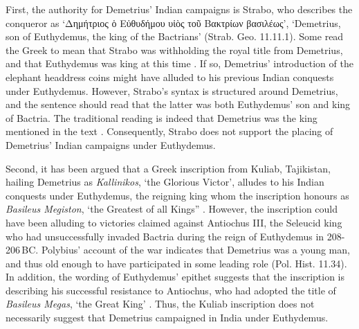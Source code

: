 \documentclass{ijsra}
\renewcommand\BC{{\,BC\xspace}}
\begin{document}
First, the authority for Demetrius’ Indian campaigns is Strabo, who describes the conqueror as \enquote*{Δημήτριος ὁ Εὐθυδήμου υἱὸς τοῦ Βακτρίων βασιλέως},
‘Demetrius, son of Euthydemus, the king of the Bactrians’ (Strab. Geo. 11.11.1).
Some read the Greek to mean that Strabo was withholding the royal title from Demetrius, and that Euthydemus was king at this time \parencites[157]{Holt2012}[99]{MacDowall2007c}.
If so, Demetrius’ introduction of the elephant headdress coins might have alluded to his previous Indian conquests under Euthydemus.
However, Strabo’s syntax is structured around Demetrius, and the sentence should read that the latter was both Euthydemus’ son and king of Bactria. The traditional reading is indeed that Demetrius was the king mentioned in the text \parencite[144]{Tarn1951}.
Consequently, Strabo does not support the placing of Demetrius’ Indian campaigns under Euthydemus.

Second, it has been argued that a Greek inscription from Kuliab, Tajikistan, hailing Demetrius as \emph{Kallinikos}, ‘the Glorious Victor’, alludes to his Indian conquests under Euthydemus, the reigning king whom the inscription honours as \emph{Basileus Megiston}, ‘the Greatest of all Kings” \parencites[110]{Hollis2011}[125]{Holt2012}[104--105]{MacDowall2007a}[99]{MacDowall2007c}.
However, the inscription could have been alluding to victories claimed against Antiochus III, the Seleucid king who had unsuccessfully invaded Bactria during the reign of Euthydemus in 208-206\BC \parencite[48]{Bopearachchi2007}.
Polybius’ account of the war indicates that Demetrius was a young man, and thus old enough to have participated in some leading role (Pol. Hist. 11.34).
In addition, the wording of Euthydemus’ epithet suggests that the inscription is describing his successful resistance to Antiochus, who had adopted the title of \emph{Basileus Megas}, ‘the Great King’ \parencites[111]{Hollis2011}[125]{Holt2012}.
Thus, the Kuliab inscription does not necessarily suggest that Demetrius campaigned in India under Euthydemus.
\end{document}
